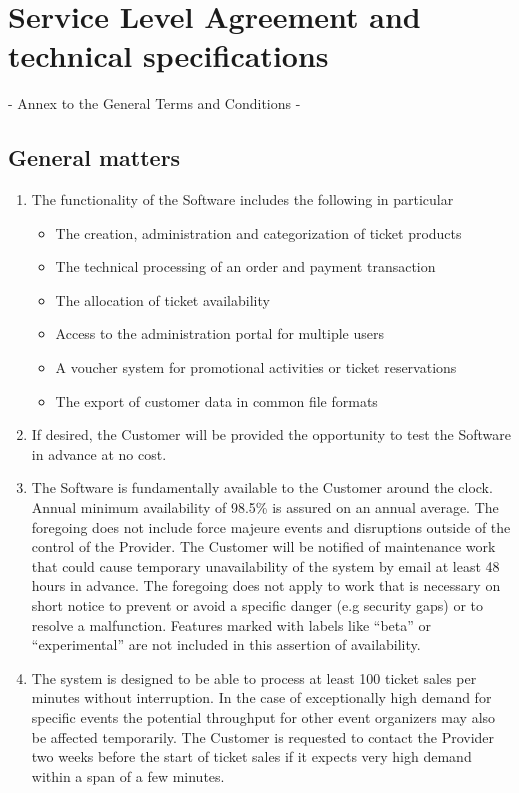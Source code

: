 \documentclass{terms}
\begin{document}
\newpage
\section{Service Level Agreement and technical specifications}
\begin{center}
- Annex to the General Terms and Conditions -
\end{center}
\subsection{General matters}
\begin{enumerate}
\item The functionality of the Software includes the following in particular \begin{itemize}
\item The creation, administration and categorization of ticket products 
\item The technical processing of an order and payment transaction 
\item The allocation of ticket availability 
\item Access to the administration portal for multiple users 
\item A voucher system for promotional activities or ticket reservations 
\item The export of customer data in common file formats
\end{itemize}
\item If desired, the Customer will be provided the opportunity to test the Software in advance at no cost.
\item The Software is fundamentally available to the Customer around the clock. Annual minimum availability of 98.5\% is assured on an annual average. The foregoing does not include force majeure events and disruptions outside of the control of the Provider. The Customer will be notified of maintenance work that could cause temporary unavailability of the system by email at least 48 hours in advance. The foregoing does not apply to work that is necessary on short notice to prevent or avoid a specific danger (e.g security gaps) or to resolve a malfunction. Features marked with labels like “beta” or “experimental” are not included in this assertion of availability.
\item The system is designed to be able to process at least 100 ticket sales per minutes without interruption. In the case of exceptionally high demand for specific events the potential throughput for other event organizers may also be affected temporarily. The Customer is requested to contact the Provider two weeks before the start of ticket sales if it expects very high demand within a span of a few minutes.

\end{enumerate}
\end{document}
